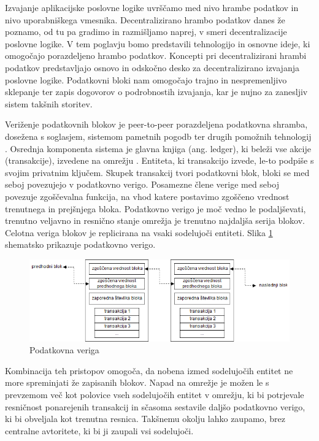 \documentclass[a4paper, 12pt]{book}
\begin{document}
Izvajanje aplikacijske poslovne logike uvrščamo med nivo hrambe podatkov in nivo uporabniškega vmesnika.
Decentralizirano hrambo podatkov danes že poznamo, od tu pa gradimo in razmišljamo naprej, v smeri decentralizacije poslovne logike.
V tem poglavju bomo predstavili tehnologijo in osnovne ideje, ki omogočajo porazdeljeno hrambo podatkov.
Koncepti pri decentralizirani hrambi podatkov predstavljajo osnovo in odskočno desko za decentralizirano izvajanja poslovne logike.
Podatkovni bloki nam omogočajo trajno in nespremenljivo sklepanje ter zapis dogovorov o podrobnostih izvajanja, kar je nujno za zanesljiv sistem takšnih storitev.

Veriženje podatkovnih blokov je peer-to-peer porazdeljena podatkovna shramba, dosežena s soglasjem, sistemom pametnih pogodb ter drugih po\-mo\-žnih tehnologij \cite{hyperledgerWeb}. 
Osrednja komponenta sistema je glavna knjiga (ang. ledger), ki beleži vse akcije (transakcije), izvedene na omrežju \cite{hyperledgerDocs}.
Entiteta, ki transakcijo izvede, le-to podpiše s svojim privatnim ključem.
Skupek transakcij tvori podatkovni blok, bloki se med seboj povezujejo v podatkovno verigo.
Posamezne člene verige med seboj povezuje zgoščevalna funkcija, na vhod katere postavimo zgoščeno vrednost trenutnega in prejšnjega bloka.
Podatkovno verigo je moč vedno le podaljševati, trenutno veljavno in resnično stanje omrežja je trenutno najdaljša serija blokov.
Celotna veriga blokov je replicirana na vsaki sodelujoči entiteti.
Slika \ref{blockchain} shematsko prikazuje podatkovno verigo.

\begin{figure}[h]
	\includegraphics[width=1.0\textwidth]{slike/blockchain.png}
	\caption{Podatkovna veriga}
	\label{blockchain}
\end{figure}

Kombinacija teh pristopov omogoča, da nobena izmed sodelujočih entitet ne more spreminjati že zapisanih blokov.
Napad na omrežje je možen le s prevzemom več kot polovice vseh sodelujočih entitet v omrežju, ki bi potrjevale resničnost ponarejenih transakcij in sčasoma sestavile daljšo podatkovno verigo, ki bi obveljala kot trenutna resnica.
Takšnemu okolju lahko zaupamo, brez centralne avtoritete, ki bi ji zaupali vsi sodelujoči.
\end{document}
